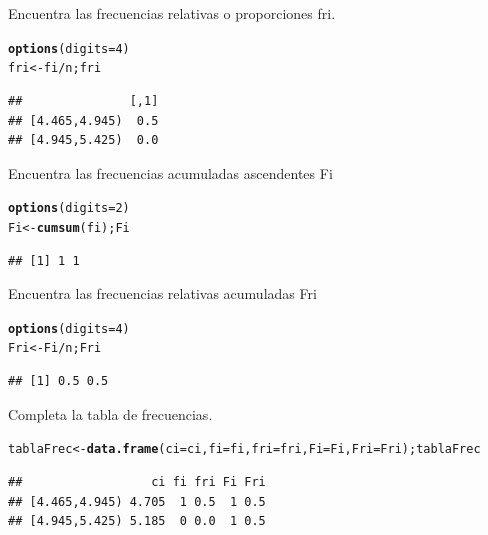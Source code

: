 \documentclass[10pt,a4paper]{article}\usepackage[]{graphicx}\usepackage[]{color}
\makeatletter
\newcommand{\hlnum}[1]{\textcolor[rgb]{0.686,0.059,0.569}{#1}}%
\newcommand{\hlopt}[1]{\textcolor[rgb]{0,0,0}{#1}}%
\newcommand{\hlstd}[1]{\textcolor[rgb]{0.345,0.345,0.345}{#1}}%
\newcommand{\hlkwb}[1]{\textcolor[rgb]{0.69,0.353,0.396}{#1}}%
\newcommand{\hlkwc}[1]{\textcolor[rgb]{0.333,0.667,0.333}{#1}}%
\newcommand{\hlkwd}[1]{\textcolor[rgb]{0.737,0.353,0.396}{\textbf{#1}}}%
\newenvironment{kframe}{%
 \def\at@end@of@kframe{}%
 \ifinner\ifhmode%
  \def\at@end@of@kframe{\end{minipage}}%
  \begin{minipage}{\columnwidth}%
 \fi\fi%
 \def\FrameCommand##1{\hskip\@totalleftmargin \hskip-\fboxsep
 \colorbox{shadecolor}{##1}\hskip-\fboxsep
     \hskip-\linewidth \hskip-\@totalleftmargin \hskip\columnwidth}%
 \MakeFramed {\advance\hsize-\width
   \@totalleftmargin\z@ \linewidth\hsize
   \@setminipage}}%
 {\par\unskip\endMakeFramed%
 \at@end@of@kframe}
\newenvironment{knitrout}{}{} %
\makeatother
\begin{document}
Encuentra las frecuencias relativas o proporciones fri. 
\begin{knitrout}
\color{fgcolor}\begin{kframe}
\begin{alltt}
\hlkwd{options}\hlstd{(}\hlkwc{digits}\hlstd{=}\hlnum{4}\hlstd{)}
\hlstd{fri} \hlkwb{<-} \hlstd{fi}\hlopt{/}\hlstd{n; fri}
\end{alltt}
\begin{verbatim}
##               [,1]
## [4.465,4.945)  0.5
## [4.945,5.425)  0.0
\end{verbatim}
\end{kframe}
\end{knitrout}

Encuentra las frecuencias acumuladas ascendentes Fi 
\begin{knitrout}
\color{fgcolor}\begin{kframe}
\begin{alltt}
\hlkwd{options}\hlstd{(}\hlkwc{digits}\hlstd{=}\hlnum{2}\hlstd{)}
\hlstd{Fi} \hlkwb{<-} \hlkwd{cumsum}\hlstd{(fi); Fi}
\end{alltt}
\begin{verbatim}
## [1] 1 1
\end{verbatim}
\end{kframe}
\end{knitrout}

 Encuentra las frecuencias relativas acumuladas Fri 
\begin{knitrout}
\color{fgcolor}\begin{kframe}
\begin{alltt}
\hlkwd{options}\hlstd{(}\hlkwc{digits}\hlstd{=}\hlnum{4}\hlstd{)}
\hlstd{Fri} \hlkwb{<-} \hlstd{Fi}\hlopt{/}\hlstd{n; Fri}
\end{alltt}
\begin{verbatim}
## [1] 0.5 0.5
\end{verbatim}
\end{kframe}
\end{knitrout}

Completa la tabla de frecuencias. 
\begin{knitrout}
\color{fgcolor}\begin{kframe}
\begin{alltt}
\hlstd{tablaFrec} \hlkwb{<-} \hlkwd{data.frame}\hlstd{(}\hlkwc{ci}\hlstd{=ci,} \hlkwc{fi}\hlstd{=fi,} \hlkwc{fri}\hlstd{=fri,} \hlkwc{Fi}\hlstd{=Fi,} \hlkwc{Fri}\hlstd{=Fri); tablaFrec}
\end{alltt}
\begin{verbatim}
##                  ci fi fri Fi Fri
## [4.465,4.945) 4.705  1 0.5  1 0.5
## [4.945,5.425) 5.185  0 0.0  1 0.5
\end{verbatim}
\end{kframe}
\end{knitrout}
\end{document}
